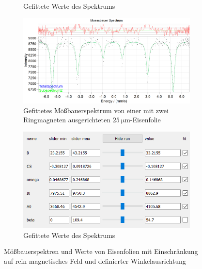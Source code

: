 \documentclass[german, %
parskip=full, %
bibliography=totoc, %
]{scrartcl}
\begin{document}
\begin{figure}[ht]
\begin{subfigure}[b]{0.4\textwidth}
	  \caption{Gefittete Werte des Spektrums}
	  \label{fig:werte25geradenB}
  \end{subfigure}
	\begin{subfigure}[b]{0.5\textwidth}
		\includegraphics[width=\textwidth]{MoessbauerEisen25MagnetRingreinB}
	  \caption{Gefittetes Mößbauerspektrum von einer mit zwei Ringmagneten ausgerichteten \(\SI{25}{\micro\meter}\)-Eisenfolie}
	  \label{fig:moess25ringnB}
  \end{subfigure}
  \begin{subfigure}[b]{0.4\textwidth}
	  \includegraphics[width=\textwidth]{WerteEisen25MagnetRingreinB}
	  \caption{Gefittete Werte des Spektrums}
	  \label{fig:werte25ringnB}
  \end{subfigure}
	\caption{Mößbauerspektren und Werte von Eisenfolien mit Einschränkung auf rein magnetisches Feld und definierter Winkelausrichtung}
	\label{fig:eisennB}
\end{figure}
\end{document}

